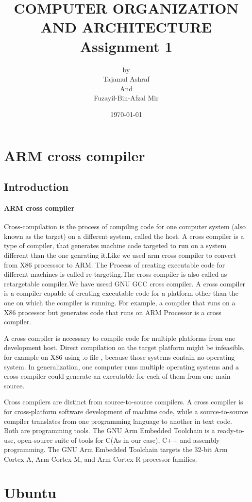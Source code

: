 \documentclass[a4paper,12pt]{article}
\title {COMPUTER ORGANIZATION AND ARCHITECTURE\\   Assignment 1 }
\author{by \\Tajamul Ashraf \\ And \\Fuzayil-Bin-Afzal Mir}
\date{\today}
\begin{document}
	
\maketitle
\newpage
\tableofcontents
\newpage

\section{ARM cross compiler}
\subsection{Introduction}
\paragraph{ARM cross compiler}
Cross-compilation is the process of compiling code for one computer system (also known as the target) on a different system, called the host.  
A  cross compiler is a type of compiler, that generates machine code targeted to run on a system different than the one genrating it.Like we used arm cross compiler to convert from X86 processsor to ARM.
The Process of creating executable code for different machines is called re-targeting.The cross compiler is also called as retargetable compiler.We have usesd GNU GCC cross compiler.
A cross compiler is a compiler capable of creating executable code for a platform other than the one on which the compiler is running. For example, a compiler that runs on a
X86 processor but generates code that runs on ARM Processor is a cross compiler.

A cross compiler is necessary to compile code for multiple platforms from one development host. Direct compilation on the target platform might be infeasible, for example on X86 using .o file
, because those systems contain no operating system. In generalization, one computer runs multiple operating systems and a cross compiler could generate an executable for each of them from one main source.

Cross compilers are distinct from source-to-source compilers. A cross compiler is for cross-platform software development of machine 
code, while a source-to-source compiler translates from one programming language to another in text code. Both are programming tools.  
The GNU Arm Embedded Toolchain is a ready-to-use, open-source suite of tools for C(As in our case), C++ and assembly programming.
The GNU Arm Embedded Toolchain targets the 32-bit Arm Cortex-A, Arm Cortex-M, and Arm Cortex-R processor families.
\section{Ubuntu}
\end{document}
